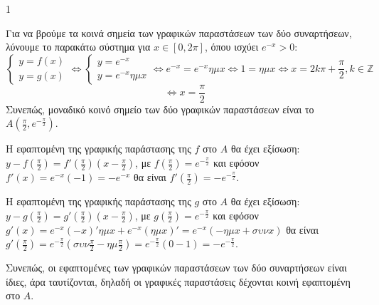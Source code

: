 \begin{ylh}{1}
    \item [Λύση]
\end{ylh}
\begin{alist}
\item [α)] Για να βρούμε τα κοινά σημεία των γραφικών παραστάσεων των δύο συναρτήσεων, λύνουμε το παρακάτω σύστημα για $x \in [0,2\pi]$, όπου ισχύει $e^{-x}>0$:
\[\left\{\begin{array}{l} y=f(x) \\ y=g(x) \end{array}\right. \Leftrightarrow \left\{\begin{array}{l} y=e^{-x} \\ y=e^{-x}\eta\mu x \end{array}\right. \Leftrightarrow e^{-x}=e^{-x}\eta\mu x \Leftrightarrow 1=\eta\mu x \Leftrightarrow x=2k\pi+\frac{\pi}{2}, k \in \mathbb{Z}\]
\[\Leftrightarrow x=\frac{\pi}{2}\]
Συνεπώς, μοναδικό κοινό σημείο των δύο γραφικών παραστάσεων είναι το $A\left(\frac{\pi}{2}, e^{-\frac{\pi}{2}}\right)$.

\item [β)] Η εφαπτομένη της γραφικής παράστασης της $f$ στο $A$ θα έχει εξίσωση:
$y-f\left(\frac{\pi}{2}\right)=f'\left(\frac{\pi}{2}\right)\left(x-\frac{\pi}{2}\right)$, με $f\left(\frac{\pi}{2}\right)=e^{-\frac{\pi}{2}}$ και εφόσον $f'(x)=e^{-x}(-1)=-e^{-x}$ θα είναι $f'\left(\frac{\pi}{2}\right)=-e^{-\frac{\pi}{2}}$.

Η εφαπτομένη της γραφικής παράστασης της $g$ στο $A$ θα έχει εξίσωση:
$y-g\left(\frac{\pi}{2}\right)=g'\left(\frac{\pi}{2}\right)\left(x-\frac{\pi}{2}\right)$, με $g\left(\frac{\pi}{2}\right)=e^{-\frac{\pi}{2}}$ και εφόσον $g'(x)=e^{-x}(-x)'\eta\mu x+e^{-x}(\eta\mu x)'=e^{-x}(-\eta\mu x+\sigma\upsilon\nu x)$ θα είναι $g'\left(\frac{\pi}{2}\right)=e^{-\frac{\pi}{2}}\left(\sigma\upsilon\nu\frac{\pi}{2}-\eta\mu\frac{\pi}{2}\right)=e^{-\frac{\pi}{2}}(0-1)=-e^{-\frac{\pi}{2}}$.

Συνεπώς, οι εφαπτομένες των γραφικών παραστάσεων των δύο συναρτήσεων είναι ίδιες, άρα ταυτίζονται, δηλαδή οι γραφικές παραστάσεις δέχονται κοινή εφαπτομένη στο $A$.


\end{alist}
